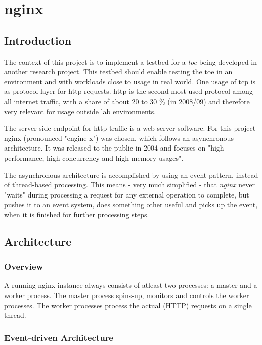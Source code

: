 \chapter{nginx}
\label{ch:nginx}

\section{Introduction}

The context of this project is to implement a testbed for a \textit{\gls{toe}} being developed in another research project. This testbed should enable testing the \gls{toe} in an environment and with workloads close to usage in real world. One usage of \gls{tcp} is as protocol layer for \gls{http} requests. \gls{http} is the second most used protocol among all internet traffic, with a share of about 20 to 30 \% (in 2008/09) \cite{internet_study} and therefore very relevant for usage outside lab environments. 

The server-side endpoint for \gls{http} traffic is a web server software. For this project nginx (pronounced "engine-x") was chosen, which follows an asynchronous architecture. It was released to the public in 2004 and focuses on "high performance, high concurrency and high memory usages"\cite{aosa}.

The asynchronous architecture is accomplished by using an event-pattern, instead of thread-based processing. This means - very much simplified - that \textit{nginx} never "waits" during processing a request for any external operation to complete, but pushes it to an event system, does something other useful and picks up the event, when it is finished for further processing steps.

\section{Architecture}
\label{sec:nginx-arch}

\subsection{Overview}

A running nginx instance always consists of atleast two processes: a master and a worker process. The master process spins-up, monitors and controls the worker processes. The worker processes process the actual (HTTP) requests on a single thread.

\subsection{Event-driven Architecture}



